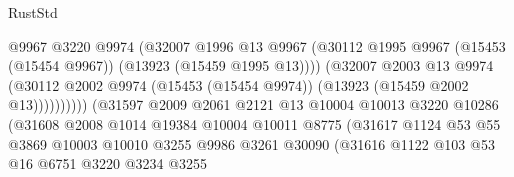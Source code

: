 \begin{lexlean}{RustStd}
\begin{coremodule}
                                          @9967
                                          @3220
                                          @9974
                                          (@32007
                                            @1996
                                            @13
                                            @9967
                                            (@30112
                                              @1995
                                              @9967
                                              (@15453 (@15454 @9967))
                                              (@13923 (@15459 @1995 @13))))
                                          (@32007
                                            @2003
                                            @13
                                            @9974
                                            (@30112
                                              @2002
                                              @9974
                                              (@15453 (@15454 @9974))
                                              (@13923 (@15459 @2002 @13))))))))))
                              (@31597
                                @2009
                                @2061
                                @2121
                                @13
                                @10004
                                @10013
                                @3220
                                @10286
                                (@31608
                                  @2008
                                  @1014
                                  @19384
                                  @10004
                                  @10011
                                  @8775
                                  (@31617
                                    @1124
                                    @53
                                    @55
                                    @3869
                                    @10003
                                    @10010
                                    @3255
                                    @9986
                                    @3261
                                    @30090
                                    (@31616
                                      @1122
                                      @103
                                      @53
                                      @16
                                      @6751
                                      @3220
                                      @3234
                                      @3255

\end{coremodule}
\end{lexlean}
